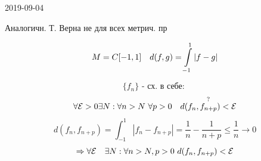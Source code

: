 \documentclass[main, 12pt, fleqn]{subfiles}
\begin{document}
\begin{lect} {2019-09-04}
    \begin{remark}
		Аналогичн. Т. Верна не для всех метрич. пр
	\end{remark}
	
	\begin{Example}
		\[M = C[-1, 1] \quad d(f, g) = \int\limits_{-1}^1 |f-g|\]
		\begin{figure}[H] %
		\end{figure}
		
		\[\{f_n\} \text{ - сх. в себе: }\]
		\[\forall \E > 0 \e N: \forall n > N \ \forall p > 0 \q \os{?}{d(f_n, f_{n + p}) < \E}\]
		\[d(f_n, f_{n + p}) = \int_{-1}^1 |f_n - f_{n + p}| = \frac{1}{n} - \frac{1}{n + p} \leq \frac{1}{n} \to 0 \]
		\[\Rightarrow \forall \mathcal{E} \quad \exists N: \forall n > N, p > 0 \ d(f_n, f_{n + p}) < \mathcal{E}\]
		\begin{figure}[h]
		\end{figure}
		

\end{Example}
\end{lect}
\end{document}
